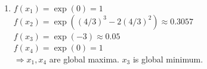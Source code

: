 \documentclass[a4paper]{article}
\begin{document}
{\begin{enumerate}
	  $\Rightarrow x_1$ is a local maximum \\[\baselineskip]
	  $f''(x_2) = \exp((4/3)^3 - 2(4/3)^2)\cdot(4) > 0$ \\
	  $\Rightarrow x_2$ is a local minimum. \\[\baselineskip]
	  The boundary points $x_3$ and $x_4$ are not considered as \textit{local} optima.
	\item $f(x_1) = \exp(0) = 1$ \\
	 $f(x_2) = \exp((4/3)^3 - 2(4/3)^2) \approx 0.3057$ \\
	  $f(x_3) = \exp(-3) \approx 0.05$ \\
	  $f(x_4) = \exp(0) = 1$ \\
	  $\Rightarrow x_1, x_4$ are global maxima.
	  $x_3$ is global minimum.
	
\end{enumerate}
}
\end{document}
